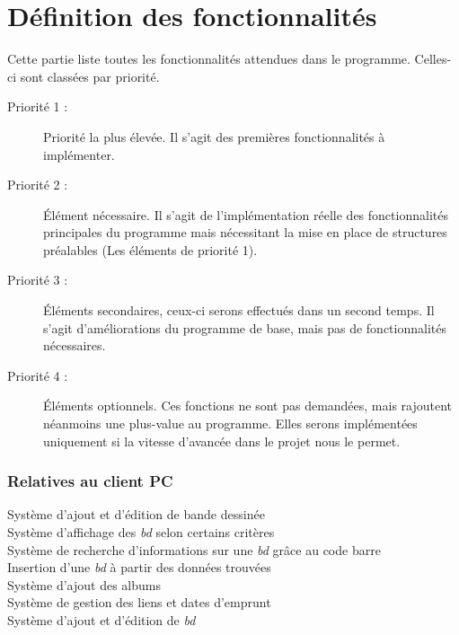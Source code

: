 \part{Définition des fonctionnalités}
Cette partie liste toutes les fonctionnalités attendues dans le programme. Celles-ci sont classées par priorité.

\begin{description}
\item [Priorité 1 :]
	Priorité la plus élevée. Il s'agit des premières fonctionnalités à implémenter.

\item [Priorité 2 :]
	Élément nécessaire. Il s'agit de l'implémentation réelle des fonctionnalités principales du programme mais nécessitant la mise en place de structures préalables (Les éléments de priorité 1). 

\item [Priorité 3 :]
	Éléments secondaires, ceux-ci serons effectués dans un second temps. Il s'agit d'améliorations du programme de base, mais pas de fonctionnalités nécessaires.  

\item [Priorité 4 :]
	Éléments optionnels. Ces fonctions ne sont pas demandées, mais rajoutent néanmoins une plus-value au programme. Elles serons implémentées uniquement si la vitesse d'avancée dans le projet nous le permet.
\end{description}


\section{Relatives au client PC}

\begin{description}

\item[Système d'ajout et d'édition de bande dessinée]

\item[Système d'affichage des \emph{bd} selon certains critères]

\item[Système de recherche d'informations sur une \emph{bd}  grâce au code barre]

\item[Insertion d'une \emph{bd} à partir des données trouvées] 

\item[Système d'ajout des albums]

\item[Système de gestion des liens et dates d'emprunt]

\item[Système d'ajout et d'édition de \emph{bd}]

\end{description}

